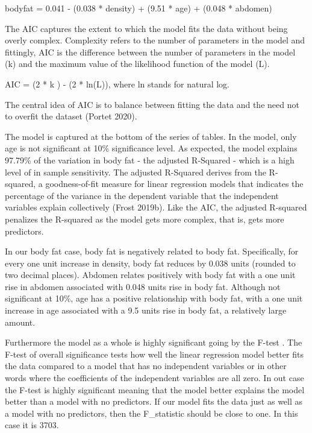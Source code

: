 \documentclass[
]{article}
\begin{document}
bodyfat = 0.041 - (0.038 * density) + (9.51 * age) + (0.048 * abdomen)

The AIC captures the extent to which the model fits the data without
being overly complex. Complexity refers to the number of parameters in
the model and fittingly, AIC is the difference between the number of
parameters in the model (k) and the maximum value of the likelihood
function of the model (L).

AIC = (2 * k ) - (2 * ln(L)), where ln stands for natural log.

The central idea of AIC is to balance between fitting the data and the
need not to overfit the dataset (Portet 2020).

The model is captured at the bottom of the series of tables. In the
model, only age is not significant at 10\% significance level. As
expected, the model explains 97.79\% of the variation in body fat - the
adjusted R-Squared - which is a high level of in sample sensitivity. The
adjusted R-Squared derives from the R-squared, a goodness-of-fit measure
for linear regression models that indicates the percentage of the
variance in the dependent variable that the independent variables
explain collectively (Frost 2019b). Like the AIC, the adjusted R-squared
penalizes the R-squared as the model gets more complex, that is, gets
more predictors.

In our body fat case, body fat is negatively related to body fat.
Specifically, for every one unit increase in density, body fat reduces
by 0.038 units (rounded to two decimal places). Abdomen relates
positively with body fat with a one unit rise in abdomen associated with
0.048 units rise in body fat. Although not significant at 10\%, age has
a positive relationship with body fat, with a one unit increase in age
associated with a 9.5 units rise in body fat, a relatively large amount.

Furthermore the model as a whole is highly significant going by the
F-test . The F-test of overall significance tests how well the linear
regression model better fits the data compared to a model that has no
independent variables or in other words where the coefficients of the
independent variables are all zero. In out case the F-test is highly
significant meaning that the model better explains the model better than
a model with no predictors. If our model fits the data just as well as a
model with no predictors, then the F\_statistic should be close to one.
In this case it is 3703.
\end{document}
